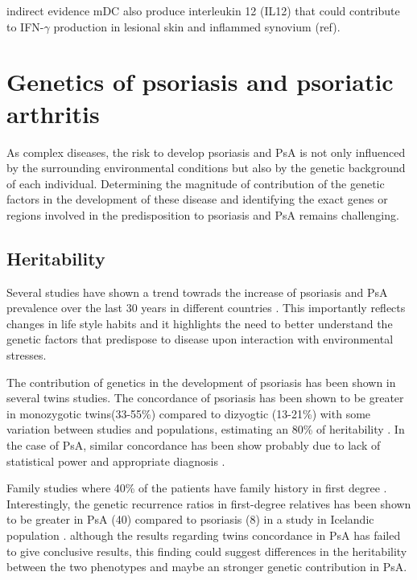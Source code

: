 {indirect evidence mDC also produce interleukin 12 (IL12) that could contribute to IFN-$\gamma$ production in lesional skin and inflammed synovium (ref). 


\section{Genetics of psoriasis and psoriatic arthritis}

As complex diseases, the risk to develop psoriasis and PsA is not only influenced by the surrounding environmental conditions but also by the genetic background of each individual. Determining the magnitude of contribution of the genetic factors in the development of these disease and identifying the exact genes or regions involved in the predisposition to psoriasis and PsA remains challenging. 

\subsection{Heritability}

Several studies have shown a trend towrads the increase of psoriasis and PsA prevalence over the last 30 years in different countries \parencite{Organization2016}. This importantly reflects changes in life style habits and it highlights the need to better understand the genetic factors that predispose to disease upon interaction with environmental stresses.

The contribution of genetics in the development of psoriasis has been shown in several twins studies. The concordance of psoriasis has been shown to be greater in monozygotic twins(33-55\%) compared to dizyogtic (13-21\%) with some variation between studies and populations, estimating an 80\% of heritability \parencite{Faber1974, Duffy1993, Pendersen2008}. In the case of PsA, similar concordance has been show probably due to lack of statistical power and appropriate diagnosis \parencite{Pendersen2008}. 

Family studies where 40\% of the patients have family history in first degree \parencite{Gladman1986}. Interestingly, the genetic recurrence ratios in first-degree relatives has been shown to be greater in PsA (40) compared to psoriasis (8) in a study in Icelandic population \parencite{Chandran2009}. although the results regarding twins concordance in PsA has failed to give conclusive results, this finding could suggest differences in the heritability between the two phenotypes and maybe an stronger genetic contribution in PsA.

}
